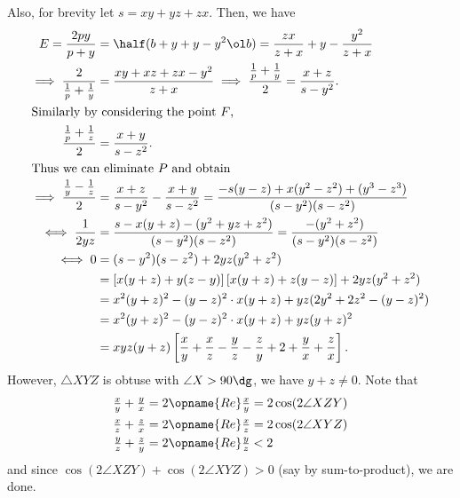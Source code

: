 \documentclass[11pt]{scrartcl}
\begin{document}
Also, for brevity let $s = xy+yz+zx$.
Then, we have
\begin{align*}
  E = \frac{2py}{p+y} &= \half(b+y+y-y^2 \ol b)
  = \frac{zx}{z+x} + y - \frac{y^2}{z+x} \\
  \implies \frac{2}{\frac1p+\frac1y} &= \frac{xy+xz+zx-y^2}{z+x}
  \implies \frac{\frac1p+\frac1y}{2} = \frac{x+z}{s-y^2}. \\
  \intertext{Similarly by considering the point $F$,}
  \frac{\frac1p+\frac1z}{2} &= \frac{x+y}{s-z^2}. \\
  \intertext{Thus we can eliminate $P$ and obtain}
  \implies \frac{\frac1y-\frac1z}{2} &= \frac{x+z}{s-y^2} - \frac{x+y}{s-z^2}
  = \frac{-s(y-z) + x(y^2-z^2) + (y^3-z^3)}{(s-y^2)(s-z^2)} \\
  \iff \frac{1}{2yz} &= \frac{s - x(y+z) - (y^2+yz+z^2)}{(s-y^2)(s-z^2)}
    = \frac{-(y^2+z^2)}{(s-y^2)(s-z^2)} \\
  \iff 0 &= (s-y^2)(s-z^2) + 2yz(y^2+z^2) \\
  &= \left[ x(y+z) + y(z-y) \right]
    \left[ x(y+z) + z(y-z) \right] + 2yz(y^2+z^2) \\
  &= x^2(y+z)^2 - (y-z)^2 \cdot x(y+z) + yz(2y^2+2z^2 - (y-z)^2) \\
  &= x^2(y+z)^2 - (y-z)^2 \cdot x(y+z) + yz(y+z)^2 \\
  &= xyz(y+z) \left[ \frac xy + \frac xz
    - \frac yz - \frac zy + 2
    + \frac yx + \frac zx \right].
\end{align*}
However, $\triangle XYZ$ is obtuse with $\angle X > 90\dg$,
we have $y+z \neq 0$.
Note that
\begin{align*}
  \tfrac xy + \tfrac yx &= 2\opname{Re} \tfrac xy = 2 \cos(2 \angle XZY) \\
  \tfrac xz + \tfrac zx &= 2\opname{Re} \tfrac xz = 2 \cos(2 \angle XYZ) \\
  \tfrac yz + \tfrac zy &= 2\opname{Re} \tfrac yz < 2
\end{align*}
and since $\cos(2\angle XZY) + \cos(2\angle XYZ) > 0$
(say by sum-to-product), we are done.
\pagebreak
\end{document}

